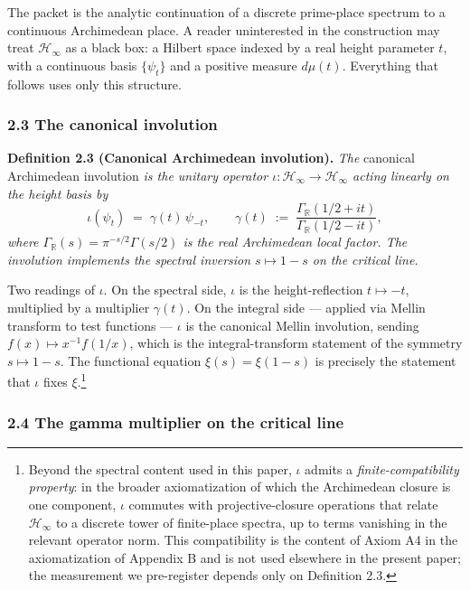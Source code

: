 \documentclass[
  letterpaper,
  11pt]{article}
\theoremstyle{plain}
\theoremstyle{definition}
\theoremstyle{remark}
\begin{document}
The packet is the analytic continuation of a discrete prime-place spectrum to a continuous Archimedean place. A reader uninterested in the construction may treat \(\mathcal{H}_\infty\) as a black box: a Hilbert space indexed by a real height parameter \(t\), with a continuous basis \(\{\psi_t\}\) and a positive measure \(d\mu(t)\). Everything that follows uses only this structure.

\subsubsection{2.3 The canonical involution}\label{the-canonical-involution}

\textbf{Definition 2.3 (Canonical Archimedean involution).} \emph{The} canonical Archimedean involution \emph{is the unitary operator \(\iota: \mathcal{H}_\infty \to \mathcal{H}_\infty\) acting linearly on the height basis by}
\[\iota(\psi_t) \;=\; \gamma(t)\,\psi_{-t}, \qquad \gamma(t) \;:=\; \frac{\Gamma_{\mathbb{R}}(1/2 + it)}{\Gamma_{\mathbb{R}}(1/2 - it)},\]
\emph{where \(\Gamma_{\mathbb{R}}(s) = \pi^{-s/2}\Gamma(s/2)\) is the real Archimedean local factor. The involution implements the spectral inversion \(s \mapsto 1 - s\) on the critical line.}

Two readings of \(\iota\). On the spectral side, \(\iota\) is the height-reflection \(t \mapsto -t\), multiplied by a multiplier \(\gamma(t)\). On the integral side --- applied via Mellin transform to test functions --- \(\iota\) is the canonical Mellin involution, sending \(f(x) \mapsto x^{-1} f(1/x)\), which is the integral-transform statement of the symmetry \(s \mapsto 1 - s\). The functional equation \(\xi(s) = \xi(1-s)\) is precisely the statement that \(\iota\) fixes \(\xi\).\footnote{Beyond the spectral content used in this paper, \(\iota\) admits a \emph{finite-compatibility property}: in the broader axiomatization of which the Archimedean closure is one component, \(\iota\) commutes with projective-closure operations that relate \(\mathcal{H}_\infty\) to a discrete tower of finite-place spectra, up to terms vanishing in the relevant operator norm. This compatibility is the content of Axiom A4 in the axiomatization of Appendix B and is not used elsewhere in the present paper; the measurement we pre-register depends only on Definition 2.3.}

\subsubsection{2.4 The gamma multiplier on the critical line}\label{the-gamma-multiplier-on-the-critical-line}
\end{document}
